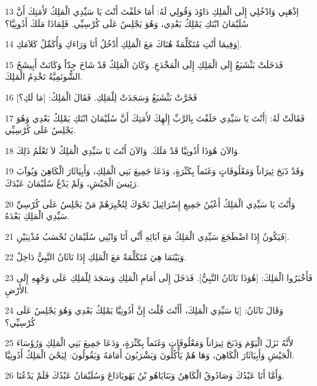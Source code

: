 \par 13 اِذْهَبِي وَادْخُلِي إِلَى الْمَلِكِ دَاوُدَ وَقُولِي لَهُ: أَمَا حَلَفْتَ أَنْتَ يَا سَيِّدِي الْمَلِكُ لأَمَتِكَ أَنَّ سُلَيْمَانَ ابْنَكِ يَمْلِكُ بَعْدِي، وَهُوَ يَجْلِسُ عَلَى كُرْسِيِّي. فَلِمَاذَا مَلَكَ أَدُونِيَّا؟
\par 14 وَفِيمَا أَنْتِ مُتَكَلِّمَةٌ هُنَاكَ مَعَ الْمَلِكِ أَدْخُلُ أَنَا وَرَاءَكِ وَأُكَمِّلُ كَلاَمَكِ].
\par 15 فَدَخَلَتْ بَثْشَبَعُ إِلَى الْمَلِكِ إِلَى الْمَخْدَعِ. وَكَانَ الْمَلِكُ قَدْ شَاخَ جِدّاً وَكَانَتْ أَبِيشَجُ الشُّونَمِيَّةُ تَخْدِمُ الْمَلِكَ.
\par 16 فَخَرَّتْ بَثْشَبَعُ وَسَجَدَتْ لِلْمَلِكِ. فَقَالَ الْمَلِكُ: [مَا لَكِ؟]
\par 17 فَقَالَتْ لَهُ: [أَنْتَ يَا سَيِّدِي حَلَفْتَ بِالرَّبِّ إِلَهِكَ لأَمَتِكَ أَنَّ سُلَيْمَانَ ابْنَكِ يَمْلِكُ بَعْدِي وَهُوَ يَجْلِسُ عَلَى كُرْسِيِّي.
\par 18 وَالآنَ هُوَذَا أَدُونِيَّا قَدْ مَلَكَ. وَالآنَ أَنْتَ يَا سَيِّدِي الْمَلِكُ لاَ تَعْلَمُ ذَلِكَ.
\par 19 وَقَدْ ذَبَحَ ثِيرَاناً وَمَعْلُوفَاتٍ وَغَنَماً بِكَثْرَةٍ، وَدَعَا جَمِيعَ بَنِي الْمَلِكِ، وَأَبِيَاثَارَ الْكَاهِنَ وَيُوآبَ رَئِيسَ الْجَيْشِ، وَلَمْ يَدْعُ سُلَيْمَانَ عَبْدَكَ.
\par 20 وَأَنْتَ يَا سَيِّدِي الْمَلِكُ أَعْيُنُ جَمِيعِ إِسْرَائِيلَ نَحْوَكَ لِتُخْبِرَهُمْ مَنْ يَجْلِسُ عَلَى كُرْسِيِّ سَيِّدِي الْمَلِكِ بَعْدَهُ.
\par 21 فَيَكُونُ إِذَا اضْطَجَعَ سَيِّدِي الْمَلِكُ مَعَ آبَائِهِ أَنِّي أَنَا وَابْنِي سُلَيْمَانَ نُحْسَبُ مُذْنِبَيْنِ].
\par 22 وَبَيْنَمَا هِيَ مُتَكَلِّمَةٌ مَعَ الْمَلِكِ إِذَا نَاثَانُ النَّبِيُّ دَاخِلٌ.
\par 23 فَأَخْبَرُوا الْمَلِكَ: [هُوَذَا نَاثَانُ النَّبِيُّ]. فَدَخَلَ إِلَى أَمَامِ الْمَلِكِ وَسَجَدَ لِلْمَلِكِ عَلَى وَجْهِهِ إِلَى الأَرْضِ.
\par 24 وَقَالَ نَاثَانُ: [يَا سَيِّدِي الْمَلِكَ، أَأَنْتَ قُلْتَ إِنَّ أَدُونِيَّا يَمْلِكُ بَعْدِي وَهُوَ يَجْلِسُ عَلَى كُرْسِيِّي؟
\par 25 لأَنَّهُ نَزَلَ الْيَوْمَ وَذَبَحَ ثِيرَاناً وَمَعْلُوفَاتٍ وَغَنَماً بِكَثْرَةٍ، وَدَعَا جَمِيعَ بَنِي الْمَلِكِ وَرُؤَسَاءَ الْجَيْشِ وَأَبِيَاثَارَ الْكَاهِنَ، وَهَا هُمْ يَأْكُلُونَ وَيَشْرَبُونَ أَمَامَهُ وَيَقُولُونَ: لِيَحْيَ الْمَلِكُ أَدُونِيَّا.
\par 26 وَأَمَّا أَنَا عَبْدُكَ وَصَادُوقُ الْكَاهِنُ وَبَنَايَاهُو بْنُ يَهُويَادَاعَ وَسُلَيْمَانُ عَبْدُكَ فَلَمْ يَدْعُنَا.
